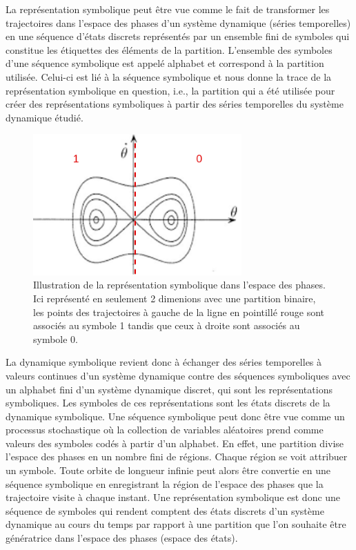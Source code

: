 La représentation symbolique peut être vue comme le fait de transformer les trajectoires dans l'espace des phases d'un système dynamique (séries temporelles) en une séquence d'états discrets représentés par un ensemble fini de symboles qui constitue les étiquettes des éléments de la partition. L'ensemble des symboles d'une séquence symbolique est appelé alphabet et correspond à la partition utilisée. Celui-ci est lié à la séquence symbolique et nous donne la trace de la représentation symbolique en question, i.e., la partition qui a été utilisée pour créer des représentations symboliques à partir des séries temporelles du système dynamique étudié.

\begin{figure}[!ht]
    \centering
    \includegraphics[width=8cm]{representation_symbolique.png}
    \caption{Illustration de la représentation symbolique dans l'espace des phases. Ici représenté en seulement 2 dimenions avec une partition binaire, les points des trajectoires à gauche de la ligne en pointillé rouge sont associés au symbole 1 tandis que ceux à droite sont associés au symbole 0.}
    \label{fig4.1}
\end{figure}

La dynamique symbolique revient donc à échanger des séries temporelles à valeurs continues d'un système dynamique contre des séquences symboliques avec un alphabet fini d'un système dynamique discret, qui sont les représentations symboliques. Les symboles de ces représentations sont les états discrets de la dynamique symbolique. Une séquence symbolique peut donc être vue comme un processus stochastique où la collection de variables aléatoires prend comme valeurs des symboles codés à partir d'un alphabet. En effet, une partition divise l'espace des phases en un nombre fini de régions. Chaque région se voit attribuer un symbole. Toute orbite de longueur infinie peut alors être convertie en une séquence symbolique en enregistrant la région de l'espace des phases que la trajectoire visite à chaque instant. Une représentation symbolique est donc une séquence de symboles qui rendent comptent des états discrets d'un système dynamique au cours du temps par rapport à une partition que l'on souhaite être génératrice dans l'espace des phases (espace des états).

